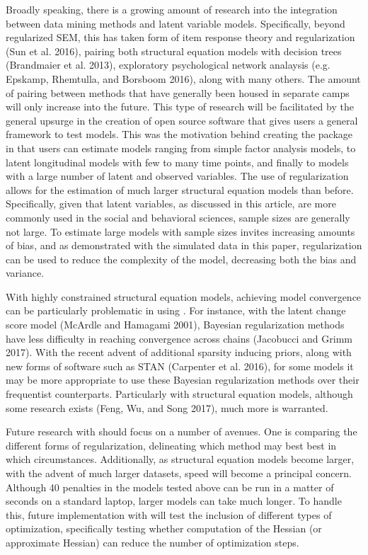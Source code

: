 \documentclass[article]{jss}
\begin{document}
Broadly speaking, there is a growing amount of research into the
integration between data mining methods and latent variable models.
Specifically, beyond regularized SEM, this has taken form of item
response theory and regularization (Sun et al. 2016), pairing both
structural equation models with decision trees (Brandmaier et al. 2013),
exploratory psychological network analaysis (e.g. Epskamp, Rhemtulla,
and Borsboom 2016), along with many others. The amount of pairing
between methods that have generally been housed in separate camps will
only increase into the future. This type of research will be facilitated
by the general upsurge in the creation of open source software that
gives users a general framework to test models. This was the motivation
behind creating the  package in that users can estimate
models ranging from simple factor analysis models, to latent
longitudinal models with few to many time points, and finally to models
with a large number of latent and observed variables. The use of
regularization allows for the estimation of much larger structural
equation models than before. Specifically, given that latent variables,
as discussed in this article, are more commonly used in the social and
behavioral sciences, sample sizes are generally not large. To estimate
large models with sample sizes invites increasing amounts of bias, and
as demonstrated with the simulated data in this paper, regularization
can be used to reduce the complexity of the model, decreasing both the
bias and variance.

With highly constrained structural equation models, achieving model
convergence can be particularly problematic in using . For
instance, with the latent change score model (McArdle and Hamagami
2001), Bayesian regularization methods have less difficulty in reaching
convergence across chains (Jacobucci and Grimm 2017). With the recent
advent of additional sparsity inducing priors, along with new forms of
software such as STAN (Carpenter et al. 2016), for some models it may be
more appropriate to use these Bayesian regularization methods over their
frequentist counterparts. Particularly with structural equation models,
although some research exists (Feng, Wu, and Song 2017), much more is
warranted.

Future research with  should focus on a number of avenues.
One is comparing the different forms of regularization, delineating
which method may best best in which circumstances. Additionally, as
structural equation models become larger, with the advent of much larger
datasets, speed will become a principal concern. Although 40 penalties
in the models tested above can be run in a matter of seconds on a
standard laptop, larger models can take much longer. To handle this,
future implementation with  will test the inclusion of
different types of optimization, specifically testing whether
computation of the Hessian (or approximate Hessian) can reduce the
number of optimization steps.
\end{document}
